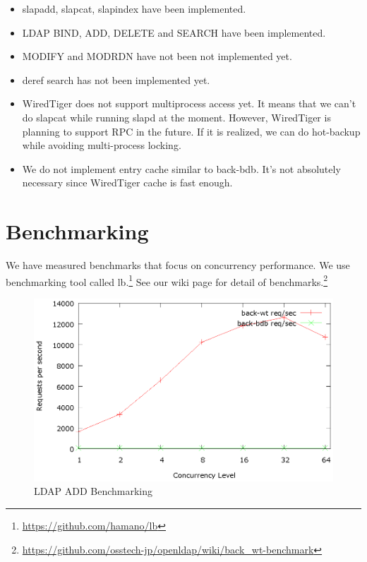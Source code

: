 \documentclass[a4paper
,12
,twocolumn
]{article}
\begin{document}
\begin{itemize}
\itemsep1pt\parskip0pt
\item
  slapadd, slapcat, slapindex have been implemented.
\item
  LDAP BIND, ADD, DELETE and SEARCH have been implemented.
\item
  MODIFY and MODRDN have not been not implemented yet.
\item
  deref search has not been implemented yet.
\item
  WiredTiger does not support multiprocess access yet. It means that we
  can't do slapcat while running slapd at the moment. However,
  WiredTiger is planning to support RPC in the future. If it is
  realized, we can do hot-backup while avoiding multi-process locking.
\item
  We do not implement entry cache similar to back-bdb. It's not
  absolutely necessary since WiredTiger cache is fast enough.
\end{itemize}

\section{Benchmarking}\label{benchmarking}

We have measured benchmarks that focus on concurrency performance. We
use benchmarking tool called lb.\footnote{\url{https://github.com/hamano/lb}}
See our wiki page for detail of benchmarks.\footnote{\url{https://github.com/osstech-jp/openldap/wiki/back_wt-benchmark}}

\begin{figure}[H]
\centering
\includegraphics[width=0.9\columnwidth]{benchmark/add.eps}
\caption{LDAP ADD Benchmarking}
\end{figure}
\end{document}
